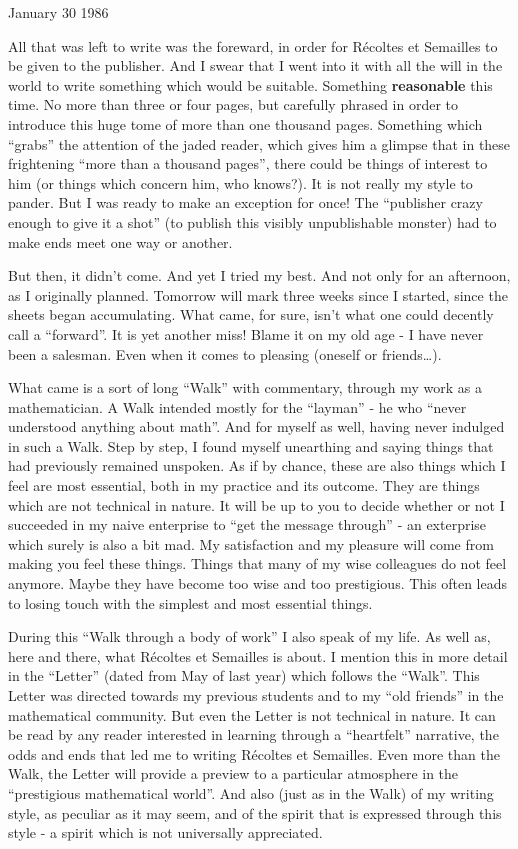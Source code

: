 January 30 1986

All that was left to write was the foreward, in order for
R\'ecoltes et Semailles to be given to the publisher.
And I swear that I went into it with all the will in the world to write something which
would be suitable. Something \textbf{reasonable} this time. No more than three or four pages,
but carefully phrased in order to introduce this huge tome of more than one thousand
pages. Something which ``grabs'' the attention of the jaded reader, 
which gives him a glimpse that in these frightening ``more than a thousand pages'', there
could be things of interest to him (or things which concern him, who knows?). It is not
really my style to pander. But I was ready to make an exception for once!
The ``publisher crazy enough to give it a shot'' (to publish this visibly unpublishable
monster) had to make ends meet one way or another. 

But then, it didn't come. And yet I tried my best. And not only for an afternoon, as I
originally planned. Tomorrow will mark three weeks since I started, since the sheets began
accumulating.
What came, for sure, isn't what one could decently call a ``forward''.
It is yet another miss! Blame it on my old age - I have never been a salesman. Even when
it comes to pleasing (oneself or friends\ldots).

What came is a sort of long ``Walk'' with commentary, through my work as a mathematician. 
A Walk intended mostly for the ``layman'' - he who ``never understood anything about
math''. And for myself as well, having never indulged in such a Walk. 
Step by step, I found myself unearthing and saying things that had previously remained
unspoken. As if by chance, these are also things which I feel are most essential, both in
my practice and its outcome. 
They are things which are not technical in nature. It will be up to you to decide whether
or not I succeeded in my naive enterprise to ``get the message through'' - an exterprise
which surely is also a bit mad. 
My satisfaction and my pleasure will come from making you feel these things. 
Things that many of my wise colleagues do not feel anymore. Maybe they have become too wise
and too prestigious.
This often leads to losing touch with the simplest and most essential things. 

During this ``Walk through a body of work'' 
I also speak of my life.
As well as, here and there, what 
R\'ecoltes et Semailles 
is about.
I mention this in more detail in the ``Letter'' 
(dated from May of last year) which
follows the ``Walk''. 
This Letter was directed towards my
previous students and to my ``old friends'' in the mathematical community. 
But even the Letter is not technical in nature. 
It can be read by any 
reader interested in learning 
through a ``heartfelt'' narrative, the odds and ends that led me to writing 
R\'ecoltes et Semailles. Even more than the Walk, the Letter will provide a 
preview to a particular atmosphere in the ``prestigious mathematical world''.
And also (just as in the Walk) of my writing style, as peculiar as it may seem, and of the
spirit that is expressed through this style - a spirit which is not universally
appreciated. 

